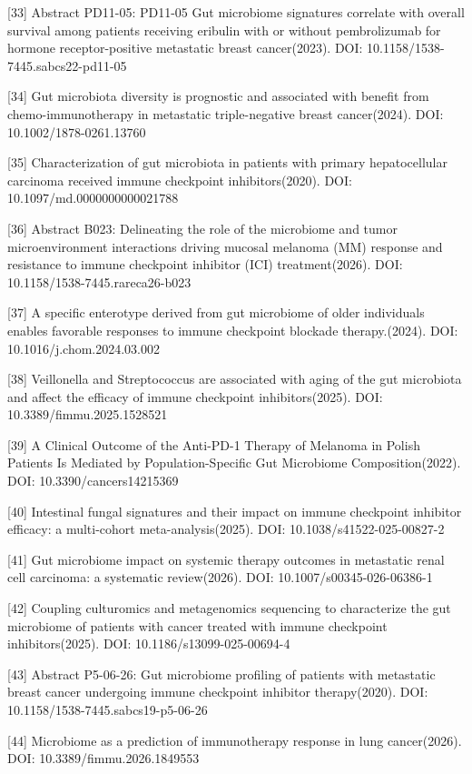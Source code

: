 \documentclass[11pt]{article}
\begin{document}
{[}33{]} Abstract PD11-05: PD11-05 Gut microbiome signatures correlate with overall survival among patients receiving eribulin with or without pembrolizumab for hormone receptor-positive metastatic breast cancer(2023). DOI: 10.1158/1538-7445.sabcs22-pd11-05

{[}34{]} Gut microbiota diversity is prognostic and associated with benefit from chemo-immunotherapy in metastatic triple-negative breast cancer(2024). DOI: 10.1002/1878-0261.13760

{[}35{]} Characterization of gut microbiota in patients with primary hepatocellular carcinoma received immune checkpoint inhibitors(2020). DOI: 10.1097/md.0000000000021788

{[}36{]} Abstract B023: Delineating the role of the microbiome and tumor microenvironment interactions driving mucosal melanoma (MM) response and resistance to immune checkpoint inhibitor (ICI) treatment(2026). DOI: 10.1158/1538-7445.rareca26-b023

{[}37{]} A specific enterotype derived from gut microbiome of older individuals enables favorable responses to immune checkpoint blockade therapy.(2024). DOI: 10.1016/j.chom.2024.03.002

{[}38{]} Veillonella and Streptococcus are associated with aging of the gut microbiota and affect the efficacy of immune checkpoint inhibitors(2025). DOI: 10.3389/fimmu.2025.1528521

{[}39{]} A Clinical Outcome of the Anti-PD-1 Therapy of Melanoma in Polish Patients Is Mediated by Population-Specific Gut Microbiome Composition(2022). DOI: 10.3390/cancers14215369

{[}40{]} Intestinal fungal signatures and their impact on immune checkpoint inhibitor efficacy: a multi-cohort meta-analysis(2025). DOI: 10.1038/s41522-025-00827-2

{[}41{]} Gut microbiome impact on systemic therapy outcomes in metastatic renal cell carcinoma: a systematic review(2026). DOI: 10.1007/s00345-026-06386-1

{[}42{]} Coupling culturomics and metagenomics sequencing to characterize the gut microbiome of patients with cancer treated with immune checkpoint inhibitors(2025). DOI: 10.1186/s13099-025-00694-4

{[}43{]} Abstract P5-06-26: Gut microbiome profiling of patients with metastatic breast cancer undergoing immune checkpoint inhibitor therapy(2020). DOI: 10.1158/1538-7445.sabcs19-p5-06-26

{[}44{]} Microbiome as a prediction of immunotherapy response in lung cancer(2026). DOI: 10.3389/fimmu.2026.1849553
\end{document}
